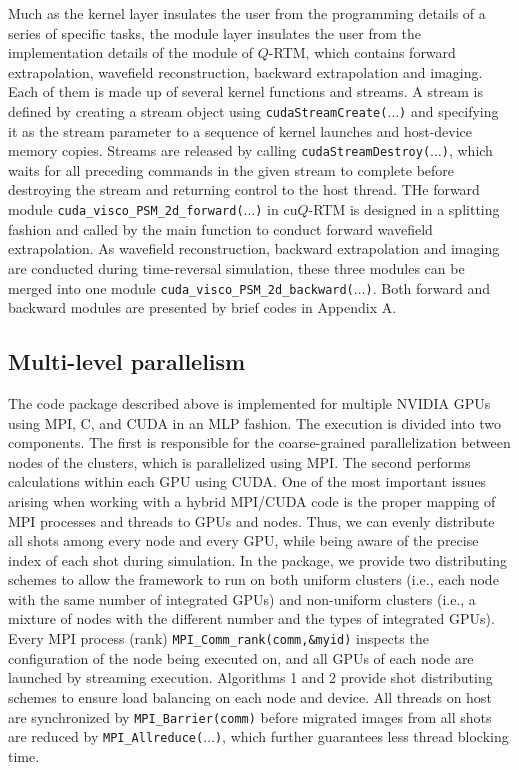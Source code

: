 Much as the kernel layer insulates the user from the programming details of a series of specific tasks, the module layer insulates the user from the implementation details of the module of $Q$-RTM, which contains forward extrapolation, wavefield reconstruction, backward extrapolation and imaging. Each of them is made up of several kernel functions and streams. A stream is defined by creating a stream object using \texttt{cudaStreamCreate($\ldots$)} and specifying it as the stream parameter to a sequence of kernel launches and host-device memory copies. Streams are released by calling \texttt{cudaStreamDestroy($\ldots$)}, which waits for all preceding commands in the given stream to complete before destroying the stream and returning control to the host thread. THe forward module \texttt{cuda\_visco\_PSM\_2d\_forward($\ldots$)} in cu$Q$-RTM is designed in a splitting fashion and called by the main function to conduct forward wavefield extrapolation. As wavefield reconstruction, backward extrapolation and imaging are conducted during time-reversal simulation, these three modules can be merged into one module \texttt{cuda\_visco\_PSM\_2d\_backward($\ldots$)}. Both forward and backward modules are presented by brief codes in Appendix A.

\subsection{Multi-level parallelism}

The code package described above is implemented for multiple NVIDIA GPUs using MPI, C, and CUDA in an MLP fashion. The execution is divided into two components. The first is responsible for the coarse-grained parallelization between nodes of the clusters, which is parallelized using MPI. The second performs calculations within each GPU using CUDA. One of the most important issues arising when working with a hybrid MPI/CUDA code is the proper mapping of MPI processes and threads to GPUs and nodes. Thus, we can evenly distribute all shots among every node and every GPU, while being aware of the precise index of each shot during simulation. In the package, we provide two distributing schemes to allow the framework to run on both uniform clusters (i.e., each node with the same number of integrated GPUs) and non-uniform clusters (i.e., a mixture of nodes with the different number and the types of integrated GPUs). Every MPI process (rank) \texttt{MPI\_Comm\_rank(comm,\&myid)} inspects the configuration of the node being executed on, and all GPUs of each node are launched by streaming execution. Algorithms 1 and 2 provide shot distributing schemes to ensure load balancing on each node and device. All threads on host are synchronized by \texttt{MPI\_Barrier(comm)} before migrated images from all shots are reduced by \texttt{MPI\_Allreduce($\ldots$)}, which further guarantees less thread blocking time.

